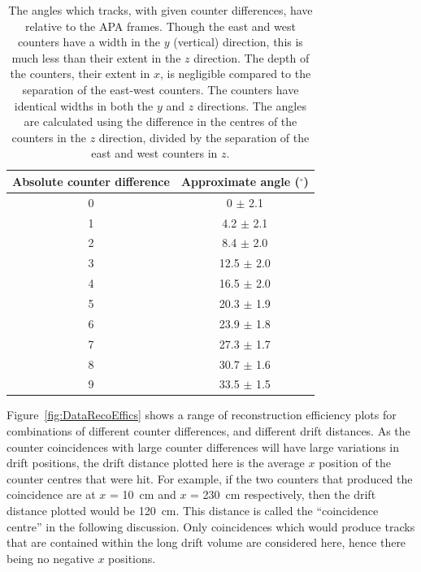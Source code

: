 \begin{table}
\caption[The angles which tracks, with given counter differences, have relative to the APA frames]
        {The angles which tracks, with given counter differences, have relative to the APA frames. Though the east and west counters have a width in the $y$ (vertical) direction, this is much less than their extent in the $z$ direction. The depth of the counters, their extent in $x$, is negligible compared to the separation of the east-west counters. The counters have identical widths in both the $y$ and $z$ directions. The angles are calculated using the difference in the centres of the counters in the $z$ direction, divided by the separation of the east and west counters in $z$.}
\centering
\label{tab:CDiffAng}
\begin{tabular}{c c}
\toprule
{Absolute counter difference} & {Approximate angle ($^{\circ}$)} \\ 
\midrule
0 & 0    $\pm$ 2.1 \\

1 & 4.2  $\pm$ 2.1 \\

2 & 8.4  $\pm$ 2.0 \\

3 & 12.5 $\pm$ 2.0 \\

4 & 16.5 $\pm$ 2.0 \\

5 & 20.3 $\pm$ 1.9 \\

6 & 23.9 $\pm$ 1.8 \\

7 & 27.3 $\pm$ 1.7 \\

8 & 30.7 $\pm$ 1.6 \\

9 & 33.5 $\pm$ 1.5 \\
\bottomrule
\end{tabular}
\end{table}

Figure~\ref{fig:DataRecoEffics} shows a range of reconstruction efficiency plots for combinations of different counter differences, and different drift distances. As the counter coincidences with large counter differences will have large variations in drift positions, the drift distance plotted here is the average $x$ position of the counter centres that were hit. For example, if the two counters that produced the coincidence are at $x$ = 10~cm and $x$ = 230~cm respectively, then the drift distance plotted would be 120~cm. This distance is called the ``coincidence centre'' in the following discussion. Only coincidences which would produce tracks that are contained within the long drift volume are considered here, hence there being no negative $x$ positions. \\

